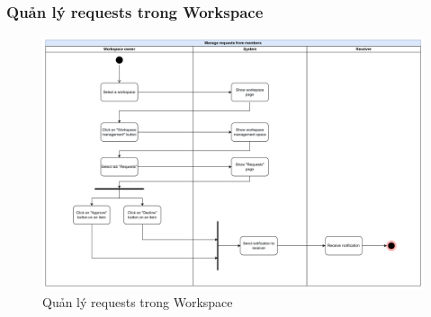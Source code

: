 \subsubsection{Quản lý requests trong Workspace}
    \begin{figure}[H]
        \centering
        \includegraphics[width=\linewidth]{Content/Phân tích và thiết kế hệ thống/documents/Sơ đồ hoạt động/images/manageRequests.png}
        \vspace{0.5cm}
        \caption{Quản lý requests trong Workspace}
        \label{fig:Quản lý requests trong Workspace}
    \end{figure}